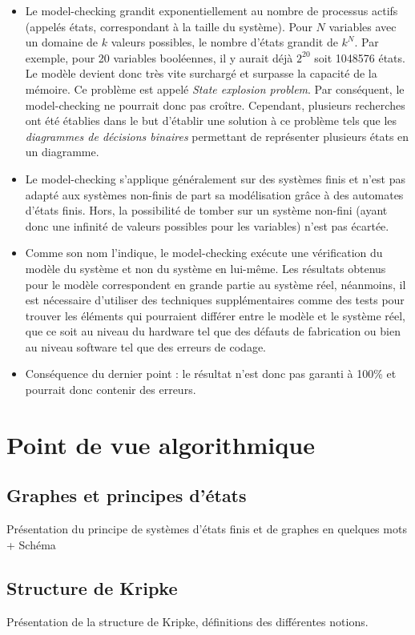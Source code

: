 \documentclass[runningheads,a4paper,10pt]{llncs}
\begin{document}
\begin{itemize}
\item Le model-checking grandit exponentiellement au nombre de processus actifs (appelés états, correspondant à la taille du système). Pour $N$ variables avec un domaine de $k$ valeurs possibles, le nombre d'états grandit de $k^{N}$. Par exemple, pour 20 variables booléennes, il y aurait déjà $2^{20}$ soit 1048576 états. Le modèle devient donc très vite surchargé et surpasse la capacité de la mémoire. Ce problème est appelé \textit{State explosion problem}. Par conséquent, le model-checking ne pourrait donc pas croître. Cependant, plusieurs recherches ont été établies dans le but d'établir une solution à ce problème tels que les \textit{diagrammes de décisions binaires} permettant de représenter plusieurs états en un diagramme. 
\item Le model-checking s'applique généralement sur des systèmes finis et n'est pas adapté aux systèmes non-finis de part sa modélisation grâce à des automates d'états finis. Hors, la possibilité de tomber sur un système non-fini (ayant donc une infinité de valeurs possibles pour les variables) n'est pas écartée. %
\item Comme son nom l'indique, le model-checking exécute une vérification du modèle du système et non du système en lui-même. Les résultats obtenus pour le modèle correspondent en grande partie au système réel, néanmoins, il est nécessaire d'utiliser des techniques supplémentaires comme des tests pour trouver les éléments qui pourraient différer entre le modèle et le système réel, que ce soit au niveau du hardware tel que des défauts de fabrication ou bien au niveau software tel que des erreurs de codage. 
\item Conséquence du dernier point : le résultat n'est donc pas garanti à 100\% et pourrait donc contenir des erreurs. 
\end{itemize}

\section{Point de vue algorithmique}

\subsection{Graphes et principes d'états}
Présentation du principe de systèmes d'états finis et de graphes en quelques mots + Schéma 

\subsection{Structure de Kripke}
Présentation de la structure de Kripke, définitions des différentes notions. 
\end{document}
